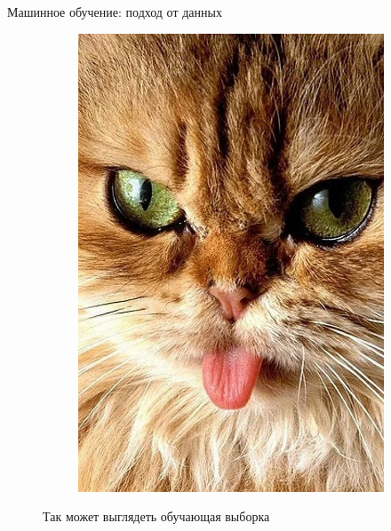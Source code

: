 \documentclass[aspectratio=169]{beamer}
\begin{document}
\begin{frame}{Машинное обучение: подход от данных}
\begin{figure}
\begin{subfigure}[b]{.1\linewidth}
            \includegraphics[width=\linewidth]{graphs/fig14_8.jpg}
        \end{subfigure}
        \caption*{Так может выглядеть обучающая выборка}
    \end{figure}
\end{frame}
\end{document}

